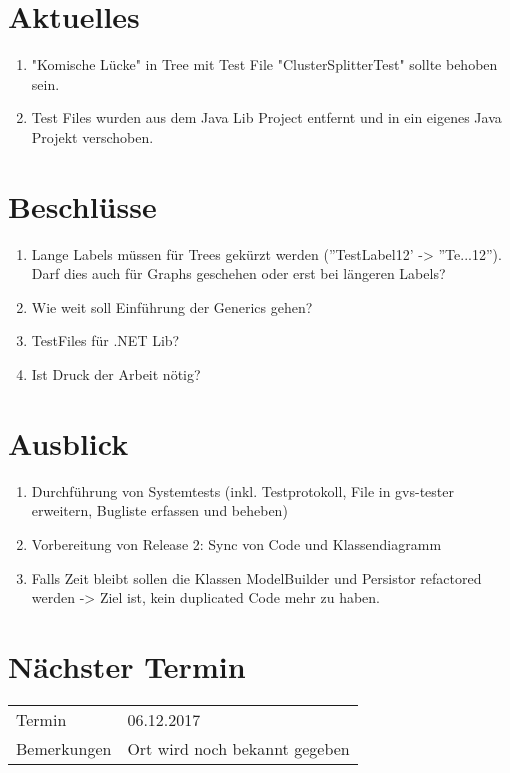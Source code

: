 \documentclass[11pt, a4paper,oneside]{scrartcl}
\begin{document}
	\section{Aktuelles}
		\begin{enumerate}
		\item "Komische Lücke" in Tree mit Test File "ClusterSplitterTest" sollte behoben sein.
		\item Test Files wurden aus dem Java Lib Project entfernt und in ein eigenes Java Projekt verschoben.
	\end{enumerate} 
	
	\section{Beschlüsse}
	\begin{enumerate}
		\item Lange Labels müssen für Trees gekürzt werden (''TestLabel12' -> ''Te...12''). Darf dies auch für Graphs geschehen oder erst bei längeren Labels?
		\item Wie weit soll Einführung der Generics gehen?
		\item TestFiles für .NET Lib?
		\item Ist Druck der Arbeit nötig?
	\end{enumerate} 
	
	\section{Ausblick}
	\begin{enumerate}
		\item Durchführung von Systemtests (inkl. Testprotokoll, File in gvs-tester erweitern, Bugliste erfassen und beheben)
		\item Vorbereitung von Release 2: Sync von Code und Klassendiagramm
		\item Falls Zeit bleibt sollen die Klassen ModelBuilder und Persistor refactored werden -> Ziel ist, kein duplicated Code mehr zu haben.
	\end{enumerate}
	
	\section{Nächster Termin}
	\begin{tabu} to \linewidth {l X }
		\toprule
		Termin & 06.12.2017  \\
		Bemerkungen & Ort wird noch bekannt gegeben  \\
		\bottomrule
	\end{tabu}
	
\end{document}
